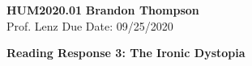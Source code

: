 \noindent
\textbf{HUM2020.01} \hfill \textbf{Brandon Thompson} \\
\normalsize Prof. Lenz \hfill Due Date: 09/25/2020 \\

\begin{center}
\textbf{Reading Response 3: The Ironic Dystopia}
\end{center}
